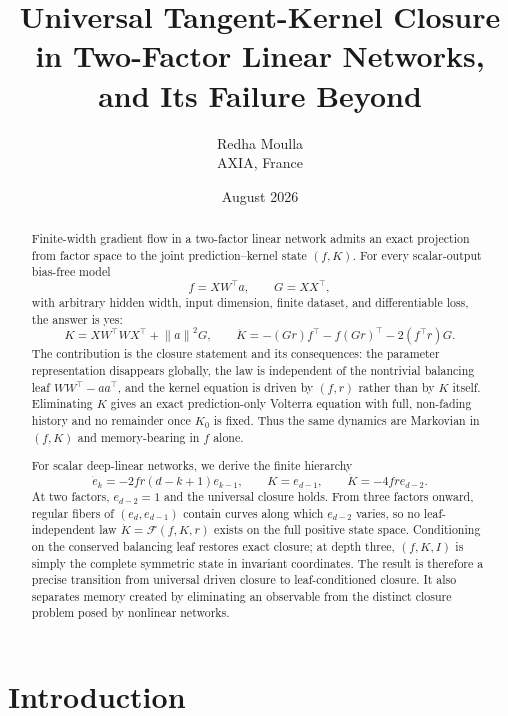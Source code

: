 \documentclass[11pt]{article}
\title{\bfseries Universal Tangent-Kernel Closure in Two-Factor Linear Networks,\\
and Its Failure Beyond}
\author{Redha Moulla\\[2mm]\small AXIA, France}
\date{August 2026}
\newcommand{\norm}[1]{\left\lVert #1\right\rVert}
\begin{document}
\maketitle

\begin{abstract}
Finite-width gradient flow in a two-factor linear network admits an exact projection from factor space to the joint prediction--kernel state $(f,K)$.  For every scalar-output bias-free model
\[
  f=XW^\top a,
  \qquad G=XX^\top,
\]
with arbitrary hidden width, input dimension, finite dataset, and differentiable loss, the answer is yes:
\[
  K=XW^\top WX^\top+\norm{a}^2G,
  \qquad
  \dot K=-(Gr)f^\top-f(Gr)^\top-2(f^\top r)G.
\]
The contribution is the closure statement and its consequences: the parameter representation disappears globally, the law is independent of the nontrivial balancing leaf $WW^\top-aa^\top$, and the kernel equation is driven by $(f,r)$ rather than by $K$ itself.  Eliminating $K$ gives an exact prediction-only Volterra equation with full, non-fading history and no remainder once $K_0$ is fixed.  Thus the same dynamics are Markovian in $(f,K)$ and memory-bearing in $f$ alone.

For scalar deep-linear networks, we derive the finite hierarchy
\[
  \dot e_k=-2fr(d-k+1)e_{k-1},
  \qquad K=e_{d-1},
  \qquad \dot K=-4fr e_{d-2}.
\]
At two factors, $e_{d-2}=1$ and the universal closure holds.  From three factors onward, regular fibers of $(e_d,e_{d-1})$ contain curves along which $e_{d-2}$ varies, so no leaf-independent law $\dot K=\mathcal F(f,K,r)$ exists on the full positive state space.  Conditioning on the conserved balancing leaf restores exact closure; at depth three, $(f,K,I)$ is simply the complete symmetric state in invariant coordinates.  The result is therefore a precise transition from universal driven closure to leaf-conditioned closure.  It also separates memory created by eliminating an observable from the distinct closure problem posed by nonlinear networks.
\end{abstract}

\section{Introduction}
\label{sec:introduction}
\end{document}
